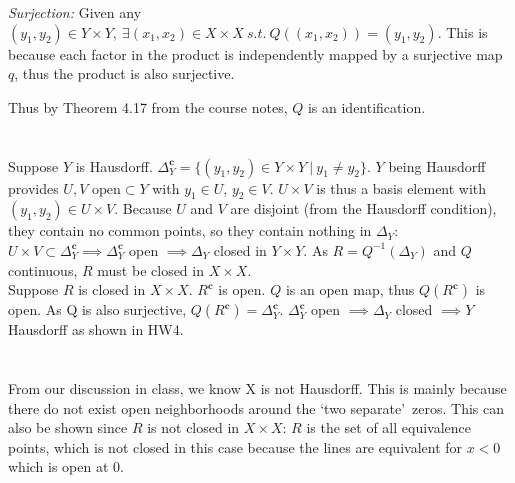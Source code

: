 \documentclass{jhwhw}
\begin{document}
 \textit{Surjection:} Given any $(y_1,y_2) \in Y\times Y,\ \exists (x_1,x_2)\in X\times X\ s.t.\ Q((x_1,x_2))=(y_1,y_2)$. This is because each factor in the product is independently mapped by a surjective map $q$, thus the product is also surjective.

Thus by Theorem 4.17 from the course notes, $Q$ is an identification.

\part{}%
\noindent Suppose $Y$ is Hausdorff. $\Delta_Y^{\mathbf{c}}=\{(y_1,y_2)\in Y\times Y\ | \ y_1\ne y_2\}$. $Y$ being Hausdorff provides $U,V\text{ open}\subset Y$ with $y_1\in U$, $y_2\in V$. $U\times V$ is thus a basis element with $(y_1,y_2) \in U\times V$. Because $U$ and $V$ are disjoint (from the Hausdorff condition), they contain no common points, so they contain nothing in $\Delta_Y$: $U\times V \subset \Delta_Y^{\mathbf{c}}\implies \Delta_Y^{\mathbf{c}}$ open $\implies \Delta_Y$ closed in $Y\times Y$. As $R = Q^{-1}(\Delta_Y)$ and $Q$ continuous, $R$ must be closed in $X\times X$.
\\

\noindent
Suppose $R$ is closed in $X\times X$. $R^{\mathbf{c}}$ is open. $Q$ is an open map, thus $Q(R^{\mathbf{c}})$ is open. As Q is also surjective, $Q(R^{\mathbf{c}})=\Delta_Y^{\mathbf{c}}$. $\Delta_Y^{\mathbf{c}}$ open $\implies\Delta_Y$ closed $\implies Y$ Hausdorff as shown in HW4.

\part{}%
\noindent From our discussion in class, we know X is not Hausdorff. This is mainly because there do not exist open neighborhoods around the \lq two separate\rq\ zeros. This can also be shown since $R$ is not closed in $X\times X$: $R$ is the set of all equivalence points, which is not closed in this case because the lines are equivalent for $x<0$ which is open at 0.
\end{document}
